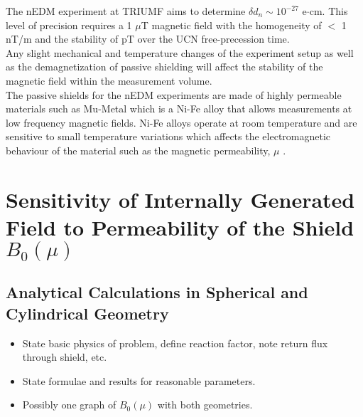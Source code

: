 \documentclass[review]{elsarticle}
\begin{document}
The nEDM experiment at TRIUMF aims to determine $\delta d_n \sim 10^{-27}$ e$\cdot$cm. This level of precision requires a 1 $\mu$T magnetic field with the homogeneity of $<$ 1 nT/m and the stability of pT over the UCN free-precession time.\\
Any slight mechanical and temperature changes of the experiment setup as well as the demagnetization of passive shielding will affect the stability of the magnetic field within the measurement volume.\\
The passive shields for the nEDM experiments are made of highly permeable materials such as Mu-Metal which is a Ni-Fe alloy that allows measurements at low frequency magnetic fields. Ni-Fe alloys operate at room temperature and are sensitive to small temperature variations which affects the electromagnetic behaviour of the material such as the magnetic permeability, $\mu$ \cite{bib:couderchon}.

\section{Sensitivity of Internally Generated Field to Permeability of the Shield $B_0(\mu)$}

\subsection{Analytical Calculations in Spherical and Cylindrical Geometry}

\begin{itemize}
\item State basic physics of problem, define reaction factor, note
  return flux through shield, etc.
\item State formulae and results for reasonable parameters.
\item Possibly one graph of $B_0(\mu)$ with both geometries.
\end{itemize}
\end{document}

